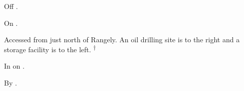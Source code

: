 
\begin{LocationList}

Off .

On .

Accessed from  just north of Rangely.
An oil drilling site is to the right and a storage facility is to the left.%
\textsuperscript{\scriptsize $\dagger$}

\Location{\GasStation \Gas \Rest}
In  on .

By .

\end{LocationList}

